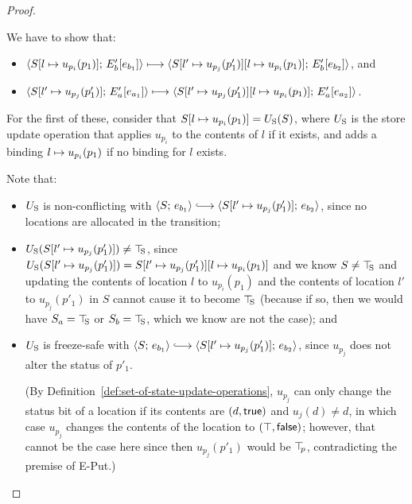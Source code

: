 \begin{proof}
\begin{enumerate}
\begin{enumerate}
\begin{itemize}
        We have to show that:
        \begin{itemize}
        \item
          $\langle S[l \mapsto u_{p_i}(p_1)];\, E'_b\hspace{-0.5mm}\left[e_{b_1}\right] \rangle
          \longmapsto
          \langle S[l' \mapsto u_{p_j}(p'_1)][l \mapsto u_{p_i}(p_1)];\, E'_b\hspace{-0.5mm}\left[e_{b_2}\right] \rangle$,
          and
        \item
          $\langle S[l' \mapsto u_{p_j}(p'_1)];\, E'_a\hspace{-0.5mm}\left[e_{a_1}\right] \rangle
          \longmapsto
          \langle S[l' \mapsto u_{p_j}(p'_1)][l \mapsto u_{p_i}(p_1)];\, E'_a\hspace{-0.5mm}\left[e_{a_2}\right] \rangle$.
        \end{itemize}

        For the first of these, consider that
        $S[l \mapsto u_{p_i}(p_1)] = U_{\mathrm{S}}(S)$, where $U_{\mathrm{S}}$ is the
        store update operation that applies $u_{p_i}$ to the
        contents of $l$ if it exists, and adds a binding
        $l \mapsto u_{p_i}(p_1)$ if no binding for $l$
        exists.

        Note that:
        \begin{itemize}
        \item $U_{\mathrm{S}}$ is non-conflicting with $\config{S}{e_{b_1}}
          \parstepsto
          \config{\extSRaw{S}{l'}{u_{p_j}(p'_1)}}{e_{b_2}}$, since
          no locations are allocated in the transition;
        \item $U_{\mathrm{S}}(S[l' \mapsto u_{p_j}(p'_1)]) \neq \top\hspace{-0.85mm}_{\mathrm{S}}$,
          since $U_{\mathrm{S}}(S[l' \mapsto u_{p_j}(p'_1)]) =
          S[l' \mapsto u_{p_j}(p'_1)][l \mapsto u_{p_i}(p_1)]$
          and we know $S \neq \top\hspace{-0.85mm}_{\mathrm{S}}$ and updating the contents of
          location $l$ to $u_{p_i}(p_1)$ and the contents of
          location $l'$ to $u_{p_j}(p'_1)$ in $S$ cannot cause it to
          become $\top\hspace{-0.85mm}_{\mathrm{S}}$ (because if so, then we would have $S_a =
          \top\hspace{-0.85mm}_{\mathrm{S}}$ or $S_b = \top\hspace{-0.85mm}_{\mathrm{S}}$, which we know are not the case);
          and
        \item $U_{\mathrm{S}}$ is freeze-safe with $\config{S}{e_{b_1}}
          \parstepsto
          \config{\extSRaw{S}{l'}{u_{p_j}(p'_1)}}{e_{b_2}}$, since
          $u_{p_j}$ does not alter the status of $p'_1$.

          (By Definition~\ref{def:set-of-state-update-operations},
          $u_{p_j}$ can only change the status bit of a location if
          its contents are $(d, \textsf{true})$ and $u_j(d) \neq
          d$, in which case $u_{p_j}$ changes the contents of the
          location to $(\top, \textsf{false})$; however, that
          cannot be the case here since then $u_{p_j}(p'_1)$ would be
          $\top\hspace{-0.85mm}_{p}$, contradicting the premise of {\sc E-Put}.)
        \end{itemize}


\end{itemize}
\end{enumerate}
\end{enumerate}
\end{proof}
